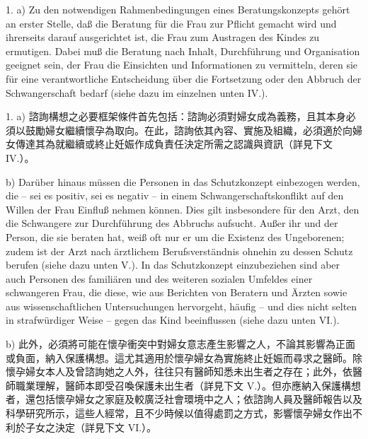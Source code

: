 \documentclass[12pt]{article}
\begin{document}
\begin{sourcepara}[title={原文D.84}]
1. a) Zu den notwendigen Rahmenbedingungen eines Beratungskonzepts gehört an erster Stelle, daß die Beratung für die Frau zur Pflicht gemacht wird und ihrerseits darauf ausgerichtet ist, die Frau zum Austragen des Kindes zu ermutigen. Dabei muß die Beratung nach Inhalt, Durchführung und Organisation geeignet sein, der Frau die Einsichten und Informationen zu vermitteln, deren sie für eine verantwortliche Entscheidung über die Fortsetzung oder den Abbruch der Schwangerschaft bedarf (siehe dazu im einzelnen unten IV.).
\end{sourcepara}
\begin{transpara}
1. a) 諮詢構想之必要框架條件首先包括：諮詢必須對婦女成為義務，且其本身必須以鼓勵婦女繼續懷孕為取向。在此，諮詢依其內容、實施及組織，必須適於向婦女傳達其為就繼續或終止妊娠作成負責任決定所需之認識與資訊（詳見下文 IV.）。
\end{transpara}

\begin{sourcepara}[title={原文D.85}]
b) Darüber hinaus müssen die Personen in das Schutzkonzept einbezogen werden, die -- sei es positiv, sei es negativ -- in einem Schwangerschaftskonflikt auf den Willen der Frau Einfluß nehmen können. Dies gilt insbesondere für den Arzt, den die Schwangere zur Durchführung des Abbruchs aufsucht. Außer ihr und der Person, die sie beraten hat, weiß oft nur er um die Existenz des Ungeborenen; zudem ist der Arzt nach ärztlichem Berufsverständnis ohnehin zu dessen Schutz berufen (siehe dazu unten V.). In das Schutzkonzept einzubeziehen sind aber auch Personen des familiären und des weiteren sozialen Umfeldes einer schwangeren Frau, die diese, wie aus Berichten von Beratern und Ärzten sowie aus wissenschaftlichen Untersuchungen hervorgeht, häufig -- und dies nicht selten in strafwürdiger Weise -- gegen das Kind beeinflussen (siehe dazu unten VI.).
\end{sourcepara}
\begin{transpara}
b) 此外，必須將可能在懷孕衝突中對婦女意志產生影響之人，不論其影響為正面或負面，納入保護構想。這尤其適用於懷孕婦女為實施終止妊娠而尋求之醫師。除懷孕婦女本人及曾諮詢她之人外，往往只有醫師知悉未出生者之存在；此外，依醫師職業理解，醫師本即受召喚保護未出生者（詳見下文 V.）。但亦應納入保護構想者，還包括懷孕婦女之家庭及較廣泛社會環境中之人；依諮詢人員及醫師報告以及科學研究所示，這些人經常，且不少時候以值得處罰之方式，影響懷孕婦女作出不利於子女之決定（詳見下文 VI.）。
\end{transpara}
\end{document}
